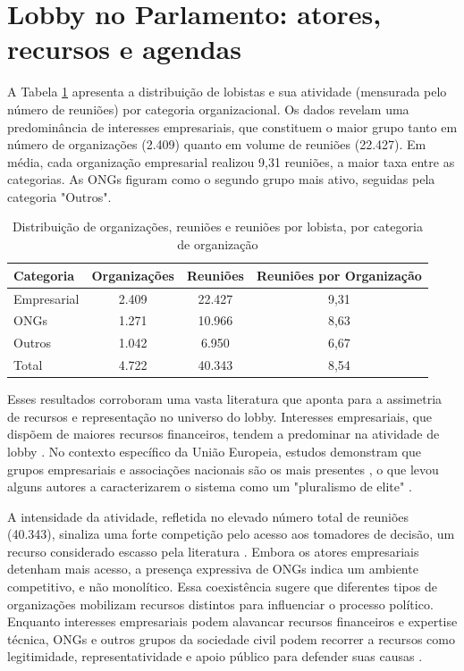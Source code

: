 \section{Lobby no Parlamento: atores, recursos e agendas}
\label{sec:resultados_descritica_lobistas}
A Tabela \ref{tab:dist_orgs_reunioes} apresenta a distribuição de lobistas e sua atividade (mensurada pelo número de reuniões) por categoria organizacional. Os dados revelam uma predominância de interesses empresariais, que constituem o maior grupo tanto em número de organizações (2.409) quanto em volume de reuniões (22.427). Em média, cada organização empresarial realizou 9,31 reuniões, a maior taxa entre as categorias. As ONGs figuram como o segundo grupo mais ativo, seguidas pela categoria "Outros".

\begin{table}[!htbp]
\centering
\caption{Distribuição de organizações, reuniões e reuniões por lobista, por categoria de organização}
\label{tab:dist_orgs_reunioes}
\begin{tabular}{lccc}
\hline
Categoria & Organizações & Reuniões & Reuniões por Organização \\
\hline
Empresarial & 2.409 & 22.427 & 9,31 \\
ONGs & 1.271 & 10.966 & 8,63 \\
Outros & 1.042 & 6.950 & 6,67 \\
\hline
Total & 4.722 & 40.343 & 8,54 \\
\hline  
\end{tabular}
\end{table}

Esses resultados corroboram uma vasta literatura que aponta para a assimetria de recursos e representação no universo do lobby. Interesses empresariais, que dispõem de maiores recursos financeiros, tendem a predominar na atividade de lobby \cite{de_figueiredo_advancing_2014}. No contexto específico da União Europeia, estudos demonstram que grupos empresariais e associações nacionais são os mais presentes \cite{dur20212wholobbies, eising2007institutional}, o que levou alguns autores a caracterizarem o sistema como um "pluralismo de elite" \cite{coen1997evolution, schmidt2006procedural}.

A intensidade da atividade, refletida no elevado número total de reuniões (40.343), sinaliza uma forte competição pelo acesso aos tomadores de decisão, um recurso considerado escasso pela literatura \cite{hall1990buying}. Embora os atores empresariais detenham mais acesso, a presença expressiva de ONGs indica um ambiente competitivo, e não monolítico. Essa coexistência sugere que diferentes tipos de organizações mobilizam recursos distintos para influenciar o processo político. Enquanto interesses empresariais podem alavancar recursos financeiros e expertise técnica, ONGs e outros grupos da sociedade civil podem recorrer a recursos como legitimidade, representatividade e apoio público para defender suas causas \cite{Coen2019, dur_measuring_2008}.

